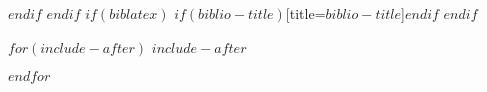\documentclass[
    $if(fontsize)$
    $fontsize$,
    $endif$
    $if(lang)$
    $babel-lang$,
    $endif$
    $if(papersize)$
    $papersize$paper,
    $endif$
    $for(classoption)$
    $classoption$$sep$,
    $endfor$
]{$documentclass$}
\begin{document}
                            $endif$
                            $endif$
                            $if(biblatex)$
                            \printbibliography$if(biblio-title)$[title=$biblio-title$]$endif$
                            $endif$

                            $for(include-after)$
                            $include-after$

                            $endfor$
                        
\end{document}
